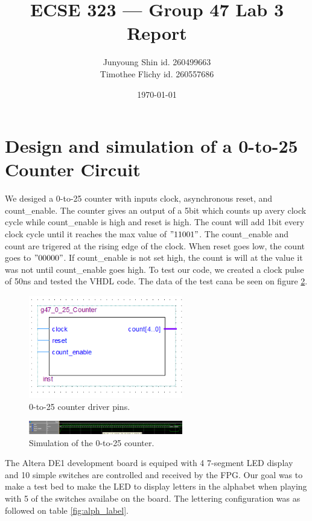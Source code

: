 \documentclass[10pt]{article}
\title{ECSE 323 --- Group 47 Lab 3 Report}
\author{Junyoung Shin id. 260499663\\ Timothee Flichy id. 260557686}
\date{\today}
\begin{document}
\maketitle
\section*{Design and simulation of a 0-to-25 Counter Circuit}
We desiged a 0-to-25 counter with inputs clock, asynchronous reset, and count_enable. The counter gives an output of a 5bit which counts up avery clock cycle while count_enable is high and reset is high. The count will add 1bit every clock cycle until it reaches the max value of $"11001"$. The count_enable and count are trigered at the rising edge of the clock. When reset goes low, the count goes to $"00000"$. If count_enable is not set high, the count is will at the value it was not until count_enable goes high.
To test our code, we created a clock pulse of 50ns and tested the VHDL code. The data of the test cana be seen on figure \ref{fig:count_test}.
\begin{figure}[!htb]
    \centering
    \includegraphics[width=0.6\textwidth]{./counter_0to25.png}
    \caption{0-to-25 counter driver pins.}
    \label{fig:count_pin}
\end{figure}
\begin{figure}[!htb]
    \centering
    \includegraphics[width=0.6\textwidth]{./test_0to25.png}
    \caption{Simulation of the 0-to-25 counter.}
    \label{fig:count_test}
\end{figure}
The Altera DE1 development board is equiped with 4 7-segment LED display and 10 simple switches are controlled and received by the FPG. Our goal was to make a test bed to make the LED to display letters in the alphabet when playing with 5 of the switches availabe on the board. The lettering configuration was as followed on table \ref{fig:alph_label}.
\end{document}
